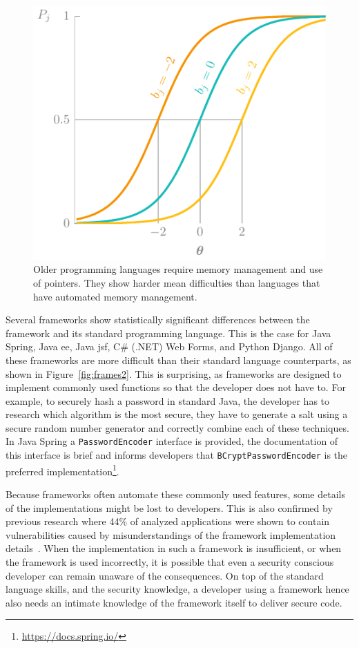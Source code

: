 \begin{figure}
    \centering
    \includegraphics[page=9]{03-education/figures/tikzfigures.pdf}
    \caption[Memory-safe versus memory-unsafe languages]{Older programming languages require memory management and use of pointers. They show harder mean difficulties than languages that have automated memory management.}
    \label{fig:frames1}
\end{figure}

Several frameworks show statistically significant differences between the framework and its standard programming language.
This is the case for Java Spring, Java \gls{ee}, Java \gls{jsf}, C\# (.NET) Web Forms, and Python Django.
All of these frameworks are more difficult than their standard language counterparts, as shown in Figure~\ref{fig:frames2}.
This is surprising, as frameworks are designed to implement commonly used functions so that the developer does not have to.
For example, to securely hash a password in standard Java, the developer has to research which algorithm is the most secure, they have to generate a salt using a secure random number generator and correctly combine each of these techniques.
In Java Spring a \texttt{PasswordEncoder} interface is provided, the documentation of this interface is brief and informs developers that \texttt{BCryptPasswordEncoder} is the preferred implementation\footnote{\url{https://docs.spring.io/}}.

Because frameworks often automate these commonly used features, some details of the implementations might be lost to developers.
This is also confirmed by previous research where 44\% of analyzed applications were shown to contain vulnerabilities caused by misunderstandings of the framework implementation details~\cite{votipka2020understanding}.
When the implementation in such a framework is insufficient, or when the framework is used incorrectly, it is possible that even a security conscious developer can remain unaware of the consequences.
On top of the standard language skills, and the security knowledge, a developer using a framework hence also needs an intimate knowledge of the framework itself to deliver secure code.

